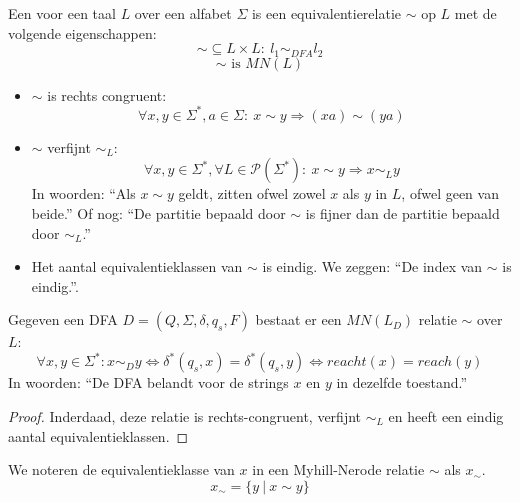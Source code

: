 \documentclass[main.tex]{subfiles}
\begin{document}
\begin{de}
  \label{de:mn-relatie}
  Een  voor een taal $L$ over een alfabet $\Sigma$ is een equivalentierelatie $\sim$ op $L$ met de volgende eigenschappen:
  \[ \sim \subseteq L \times L:\ l_{1} \sim_{DFA} l_{2}\]
  \[ \sim \text{ is } MN(L) \]
  \begin{itemize}
  \item $\sim$ is rechts congruent:
    \[ \forall x,y \in \Sigma^{*}, a \in \Sigma:\ x \sim y \Rightarrow (xa) \sim (ya) \]
  \item $\sim$ verfijnt $\sim_{L}$:
    \[ \forall x,y \in \Sigma^{*}, \forall L\in \mathcal{P}(\Sigma^{*}):\ x \sim y \Rightarrow x \sim_{L} y\]
    In woorden: ``Als $x \sim y$ geldt, zitten ofwel zowel $x$ als $y$ in $L$, ofwel geen van beide.''
    Of nog: ``De partitie bepaald door $\sim$ is fijner dan de partitie bepaald door $\sim_{L}$.''
  \item Het aantal equivalentieklassen van $\sim$ is eindig.
    We zeggen: ``De index van $\sim$ is eindig.''.
  \end{itemize}
\end{de}

\begin{st}
  \label{st:dfa-naar-mn-relatie}
  Gegeven een DFA $D = (Q,\Sigma,\delta,q_{s},F)$ bestaat er een $MN(L_{D})$ relatie $\sim$ over $L$:
  \[ \forall x,y \in \Sigma^{*}: x \sim_{D} y \Leftrightarrow \delta^{*}(q_{s},x) = \delta^{*}(q_{s},y) \Leftrightarrow reacht(x) = reach(y) \]
  In woorden: ``De DFA belandt voor de strings $x$ en $y$ in dezelfde toestand.''
  \begin{proof}
    Inderdaad, deze relatie is rechts-congruent, verfijnt $\sim_{L}$ en heeft een eindig aantal equivalentieklassen.
  \end{proof}
\end{st}

\begin{de}
  We noteren de equivalentieklasse van $x$ in een Myhill-Nerode relatie $\sim$ als $x_{\sim}$.
  \[ x_{\sim} = \{ y\ |\ x \sim y \} \]
\end{de}
\end{document}
